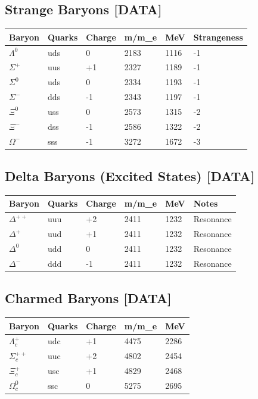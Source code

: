 \documentclass[
  11pt,
  letterpaper,
  twoside,
  openright]{book}
\begin{document}
\subsection{Strange Baryons {[}DATA{]}}\label{strange-baryons-data}

\begin{longtable}[]{@{}llllll@{}}
\toprule\noalign{}
Baryon & Quarks & Charge & m/m\_e & MeV & Strangeness \\
\midrule\noalign{}
\endhead
\bottomrule\noalign{}
\endlastfoot
\(\Lambda^0\) & uds & 0 & 2183 & 1116 & -1 \\
\(\Sigma^+\) & uus & +1 & 2327 & 1189 & -1 \\
\(\Sigma^0\) & uds & 0 & 2334 & 1193 & -1 \\
\(\Sigma^-\) & dds & -1 & 2343 & 1197 & -1 \\
\(\Xi^0\) & uss & 0 & 2573 & 1315 & -2 \\
\(\Xi^-\) & dss & -1 & 2586 & 1322 & -2 \\
\(\Omega^-\) & sss & -1 & 3272 & 1672 & -3 \\
\end{longtable}

\subsection{Delta Baryons (Excited States)
{[}DATA{]}}\label{delta-baryons-excited-states-data}

\begin{longtable}[]{@{}llllll@{}}
\toprule\noalign{}
Baryon & Quarks & Charge & m/m\_e & MeV & Notes \\
\midrule\noalign{}
\endhead
\bottomrule\noalign{}
\endlastfoot
\(\Delta^{++}\) & uuu & +2 & 2411 & 1232 & Resonance \\
\(\Delta^+\) & uud & +1 & 2411 & 1232 & Resonance \\
\(\Delta^0\) & udd & 0 & 2411 & 1232 & Resonance \\
\(\Delta^-\) & ddd & -1 & 2411 & 1232 & Resonance \\
\end{longtable}

\subsection{Charmed Baryons {[}DATA{]}}\label{charmed-baryons-data}

\begin{longtable}[]{@{}lllll@{}}
\toprule\noalign{}
Baryon & Quarks & Charge & m/m\_e & MeV \\
\midrule\noalign{}
\endhead
\bottomrule\noalign{}
\endlastfoot
\(\Lambda_c^+\) & udc & +1 & 4475 & 2286 \\
\(\Sigma_c^{++}\) & uuc & +2 & 4802 & 2454 \\
\(\Xi_c^+\) & usc & +1 & 4829 & 2468 \\
\(\Omega_c^0\) & ssc & 0 & 5275 & 2695 \\
\end{longtable}
\end{document}
